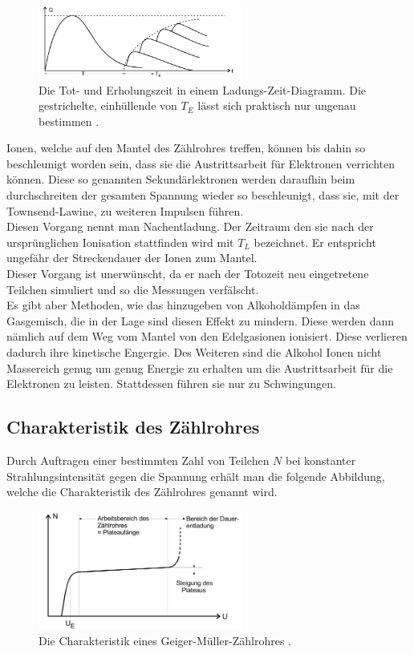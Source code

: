 \begin{figure}[H]
    \centering
    \includegraphics[width=0.6\textwidth]{images/Totozeit.PNG}
    \caption{Die Tot- und Erholungszeit in einem Ladungs-Zeit-Diagramm. Die gestrichelte, einhüllende von $T_E$ lässt sich praktisch nur ungenau bestimmen \protect \cite{V703}.}
    \label{img:tot}
\end{figure}

\noindent
Ionen, welche auf den Mantel des Zählrohres treffen, können bis dahin so beschleunigt worden sein, dass sie die Austrittsarbeit für Elektronen verrichten können.
Diese so genannten Sekundärlektronen werden daraufhin beim durchschreiten der gesamten Spannung wieder so beschleunigt, dass sie, mit der Townsend-Lawine, zu weiteren Impulsen führen.\\
Diesen Vorgang nennt man Nachentladung. Der Zeitraum den sie nach der ursprünglichen Ionisation stattfinden wird mit $T_L$ bezeichnet. Er entspricht ungefähr der Streckendauer der Ionen zum Mantel.\\
Dieser Vorgang ist unerwünscht, da er nach der Totozeit neu eingetretene Teilchen simuliert und so die Messungen verfälscht. \\
Es gibt aber Methoden, wie das hinzugeben von Alkoholdämpfen in das Gasgemisch, die in der Lage sind diesen Effekt zu mindern.
Diese werden dann nämlich auf dem Weg vom Mantel von den Edelgasionen ionisiert. Diese verlieren dadurch ihre kinetische Engergie. 
Des Weiteren sind die Alkohol Ionen nicht Massereich genug um genug Energie zu erhalten um die Austrittsarbeit für die Elektronen zu leisten. Stattdessen führen sie nur zu Schwingungen.\\


\subsection{Charakteristik des Zählrohres}

\noindent
Durch Auftragen einer bestimmten Zahl von Teilchen $N$ bei konstanter Strahlungsintensität 
gegen die Spannung erhält man die folgende Abbildung, welche die Charakteristik des Zählrohres genannt wird.

\begin{figure}[H]
    \centering
    \includegraphics[width=0.6\textwidth]{images/charakteristik.PNG}
    \caption{Die Charakteristik eines Geiger-Müller-Zählrohres \protect \cite{V703}.}
    \label{img:char}
\end{figure}


